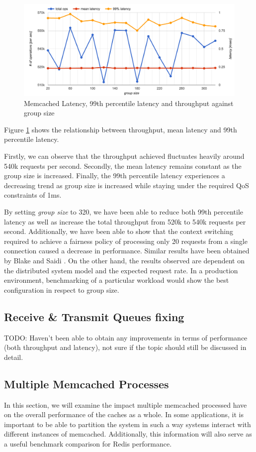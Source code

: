 \begin{figure}[h]
    \includegraphics[width=\textwidth]{./res/5_memcached_group_size.png}
    \caption{Memcached Latency, 99th percentile latency and throughput against group size}
    \label{fig:memcached_group_size}
\end{figure}

Figure \ref{fig:memcached_group_size} shows the relationship between throughput, mean latency and 99th percentile latency.

Firstly, we can observe that the throughput achieved fluctuates heavily around 540k requests per second. Secondly, the mean latency remains constant as the group size is increased. Finally, the 99th percentile latency experiences a decreasing trend as group size is increased while staying under the required QoS constraints of 1ms.

By setting \textit{group size} to 320, we have been able to reduce both 99th percentile latency as well as increase the total throughput from 520k to 540k requests per second. Additionally, we have been able to show that the context switching required to achieve a fairness policy of processing only 20 requests from a single connection caused a decrease in performance. Similar results have been obtained by Blake and Saidi \cite{blake54does}. On the other hand, the results observed are dependent on the distributed system model and the expected request rate. In a production environment, benchmarking of a particular workload would show the best configuration in respect to group size.

\subsection{Receive \& Transmit Queues fixing}
TODO: Haven't been able to obtain any improvements in terms of performance (both throughput and latency), not sure if the topic should still be discussed in detail.


\subsection{Multiple Memcached Processes}

In this section, we will examine the impact multiple memcached processed have on the overall performance of the caches as a whole. In some applications, it is important to be able to partition the system in such a way systems interact with different instances of memcached. Additionally, this information will also serve as a useful benchmark comparison for Redis performance.